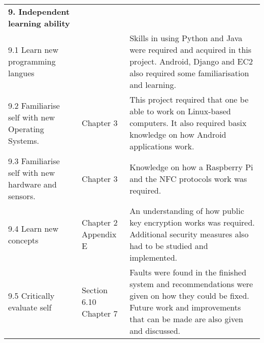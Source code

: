 \begin{longtable}{|p{5.9cm}|p{2.2cm}|p{5.5cm}|}
{\bf 9. Independent learning ability} &            &            \\
9.1 Learn new programming langues &            & Skills in using Python and Java were required and acquired in this project. Android, Django and EC2 also required some familiarisation and learning.  \\

9.2 Familiarise self with new Operating Systems. &       Chapter 3     & This
project required that one be able to work on Linux-based computers. It also required basix knowledge on how Android applications work. \\

9.3 Familiarise self with new hardware and sensors. &      Chapter 3      &
Knowledge on how a Raspberry Pi and the NFC protocols work was required.  \\

9.4 Learn new concepts &       Chapter 2
Appendix E     & An understanding of how
public key encryption works was required. Additional security measures also had  to be studied and implemented. \\

9.5 Critically evaluate self & \parbox[t]{5cm}{Section 6.10\\
Chapter 7} & Faults were found in the finished system and recommendations were given on
how they could be fixed. Future work and improvements that can be made are also given and discussed.  \\
\hline
\end{longtable}  